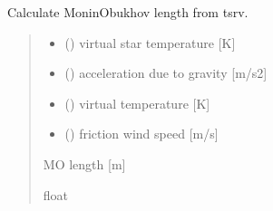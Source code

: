 \documentclass[letterpaper,10pt,english]{sphinxmanual}
\begin{document}

\begin{fulllineitems}
\label{\detokenize{users_guide:AirSeaFluxCode.flux_subs.get_Ltsrv}}
\pysigstartsignatures
{}
\pysigstopsignatures
\sphinxAtStartPar
Calculate Monin\sphinxhyphen{}Obukhov length from tsrv.
\begin{quote}\begin{description}
\begin{itemize}
\item {} 
\sphinxAtStartPar
{} () \textendash{} virtual star temperature {[}K{]}

\item {} 
\sphinxAtStartPar
{} () \textendash{} acceleration due to gravity {[}m/s2{]}

\item {} 
\sphinxAtStartPar
{} () \textendash{} virtual temperature {[}K{]}

\item {} 
\sphinxAtStartPar
{} () \textendash{} friction wind speed {[}m/s{]}

\end{itemize}

\sphinxAtStartPar
{} \textendash{} M\sphinxhyphen{}O length {[}m{]}

\sphinxAtStartPar
float

\end{description}\end{quote}

\end{fulllineitems}

\end{document}
